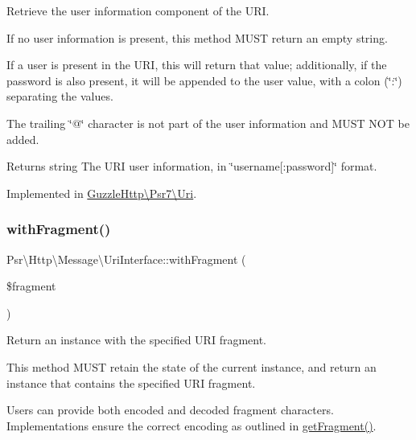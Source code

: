 Retrieve the user information component of the U\+RI.

If no user information is present, this method M\+U\+ST return an empty string.

If a user is present in the U\+RI, this will return that value; additionally, if the password is also present, it will be appended to the user value, with a colon (\char`\"{}\+:\char`\"{}) separating the values.

The trailing \char`\"{}@\char`\"{} character is not part of the user information and M\+U\+ST N\+OT be added.

\begin{DoxyReturn}{Returns}
string The U\+RI user information, in \char`\"{}username\mbox{[}\+:password\mbox{]}\char`\"{} format. 
\end{DoxyReturn}


Implemented in \hyperlink{classGuzzleHttp_1_1Psr7_1_1Uri_aabfb1fcf87f211fc73783d99adf09c8e}{Guzzle\+Http\textbackslash{}\+Psr7\textbackslash{}\+Uri}.

\mbox{\label{interfacePsr_1_1Http_1_1Message_1_1UriInterface_a637020abdaa77e0c60a2377172395bf1}} 
\subsubsection{\texorpdfstring{with\+Fragment()}{withFragment()}}
{\footnotesize\ttfamily Psr\textbackslash{}\+Http\textbackslash{}\+Message\textbackslash{}\+Uri\+Interface\+::with\+Fragment (\begin{DoxyParamCaption}\item[{}]{\$fragment }\end{DoxyParamCaption})}

Return an instance with the specified U\+RI fragment.

This method M\+U\+ST retain the state of the current instance, and return an instance that contains the specified U\+RI fragment.

Users can provide both encoded and decoded fragment characters. Implementations ensure the correct encoding as outlined in \hyperlink{interfacePsr_1_1Http_1_1Message_1_1UriInterface_a95df80b1a48010817c8c135ef5d9d5b1}{get\+Fragment()}.

